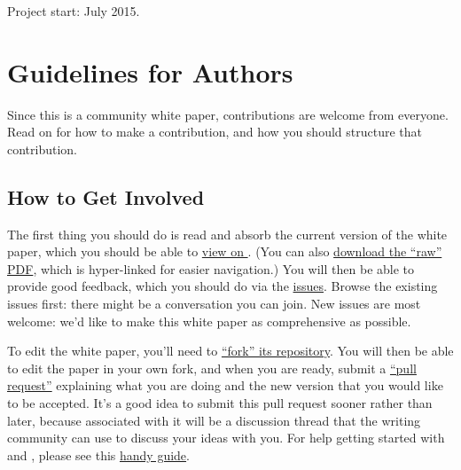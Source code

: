 \raggedright{Project start: July 2015.}

\clearpage


\section*{Guidelines for Authors}
\def\secname{guidelines}\label{sec:\secname}


Since this is a community white paper, contributions are welcome from
everyone. Read on for how to make a contribution, and how you should
structure that contribution.

\subsection{How to Get Involved}

The first thing you should do is read and absorb the current version
of the white paper, which you should be able to
\href{http://ls.st/iw2}{view on \GitHub}. (You can also
\href{https://github.com/LSSTScienceCollaborations/ObservingStrategy/raw/master/whitepaper/LSST_Observing_Strategy_White_Paper.pdf}{download
the ``raw'' PDF}, which is hyper-linked for easier navigation.) You
will then be able to provide good feedback, which you should do via
the
\href{https://github.com/LSSTScienceCollaborations/ObservingStrategy/issues}{\GitHub
issues}. Browse the existing issues first: there might be a
conversation you can  join. New issues are most welcome: we'd like to
make this white paper as comprehensive as possible.

To edit the white paper, you'll need to
\href{https://help.github.com/articles/fork-a-repo/}{``fork'' its
repository}. You will then  be able to edit the paper in your own
fork, and when you are ready,  submit a
\href{https://help.github.com/articles/using-pull-requests/}{``pull
request''} explaining what you are doing and the new version that  you
would like to be accepted. It's a good idea to submit this pull
request sooner rather than later, because associated with it will be a
discussion thread that the writing community can use to discuss your
ideas with you. For help getting started with \git and \GitHub, please
see this
\href{https://github.com/drphilmarshall/GettingStarted#top}{handy
guide}.


